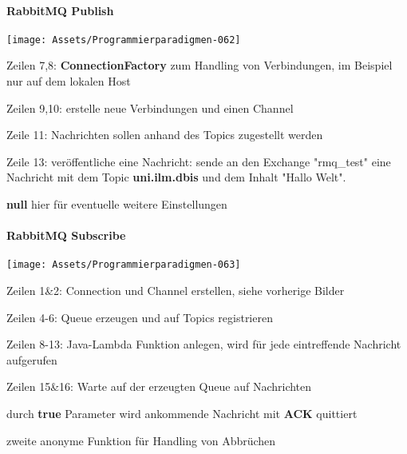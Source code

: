 \documentclass[10pt]{article}
\begin{document}
\paragraph{RabbitMQ Publish}
\begin{center}
  \centering
  \texttt{[image: Assets/Programmierparadigmen-062]}
\end{center}
\begin{itemize*}
  \item Zeilen 7,8: \textbf{ConnectionFactory} zum Handling von Verbindungen, im Beispiel nur auf dem lokalen Host
  \item Zeilen 9,10: erstelle neue Verbindungen und einen Channel
  \item Zeile 11: Nachrichten sollen anhand des Topics zugestellt werden
  \item Zeile 13: veröffentliche eine Nachricht: sende an den Exchange "rmq\_test" eine Nachricht mit dem Topic \textbf{uni.ilm.dbis} und dem Inhalt "Hallo Welt".
  \begin{itemize*}
    \item \textbf{null} hier für eventuelle weitere Einstellungen
  \end{itemize*}
\end{itemize*}

\paragraph{RabbitMQ Subscribe}
\begin{center}
  \centering
  \texttt{[image: Assets/Programmierparadigmen-063]}
\end{center}
\begin{itemize*}
  \item Zeilen 1\&2: Connection und Channel erstellen, siehe vorherige Bilder
  \item Zeilen 4-6: Queue erzeugen und auf Topics registrieren
  \item Zeilen 8-13: Java-Lambda Funktion anlegen, wird für jede eintreffende Nachricht aufgerufen
  \item Zeilen 15\&16: Warte auf der erzeugten Queue auf Nachrichten
  \begin{itemize*}
    \item durch \textbf{true} Parameter wird ankommende Nachricht mit \textbf{ACK} quittiert
    \item zweite anonyme Funktion für Handling von Abbrüchen
  \end{itemize*}
\end{itemize*}
\end{document}

